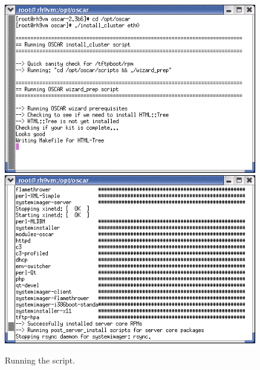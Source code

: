\begin{figure}[h!]
  \begin{center}
    \centerline{
      \includegraphics[scale=\imgscale]{figs/1a_sbs-install-oscar}
      \hspace{\imghskip}
      \includegraphics[scale=\imgscale]{figs/1b_sbs-install-oscar2}
      }
    \caption{Running the  script.}
    \label{fig:sbs-install-oscar}
  \end{center}
\end{figure}



